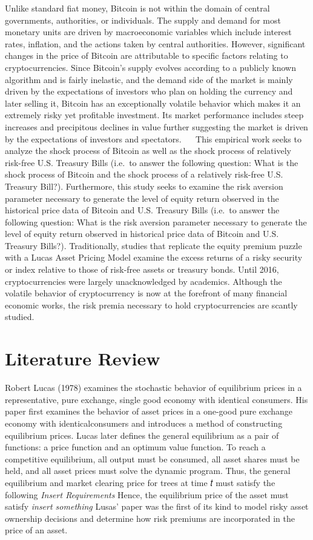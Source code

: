 \documentclass[]{article}
\begin{document}
Unlike standard fiat money, Bitcoin is not within the domain of central
governments, authorities, or individuals. The supply and demand for most
monetary units are driven by macroeconomic variables which include
interest rates, inflation, and the actions taken by central authorities.
However, significant changes in the price of Bitcoin are attributable to
specific factors relating to cryptocurrencies. Since Bitcoin's supply
evolves according to a publicly known algorithm and is fairly inelastic,
and the demand side of the market is mainly driven by the expectations
of investors who plan on holding the currency and later selling it,
Bitcoin has an exceptionally volatile behavior which makes it an
extremely risky yet profitable investment. Its market performance
includes steep increases and precipitous declines in value further
suggesting the market is driven by the expectations of investors and
spectators.   This empirical work seeks to analyze the shock process of
Bitcoin as well as the shock process of relatively risk-free U.S.
Treasury Bills (i.e.~to answer the following question: What is the shock
process of Bitcoin and the shock process of a relatively risk-free U.S.
Treasury Bill?). Furthermore, this study seeks to examine the risk
aversion parameter necessary to generate the level of equity return
observed in the historical price data of Bitcoin and U.S. Treasury Bills
(i.e.~to answer the following question: What is the risk aversion
parameter necessary to generate the level of equity return observed in
historical price data of Bitcoin and U.S. Treasury Bills?).
Traditionally, studies that replicate the equity premium puzzle with a
Lucas Asset Pricing Model examine the excess returns of a risky security
or index relative to those of risk-free assets or treasury bonds. Until
2016, cryptocurrencies were largely unacknowledged by academics.
Although the volatile behavior of cryptocurrency is now at the forefront
of many financial economic works, the risk premia necessary to hold
cryptocurrencies are scantly studied.

\section{Literature Review}\label{literature-review}

Robert Lucas (1978) examines the stochastic behavior of equilibrium
prices in a representative, pure exchange, single good economy with
identical consumers. His paper first examines the behavior of asset
prices in a one-good pure exchange economy with identicalconsumers and
introduces a method of constructing equilibrium prices. Lucas later
defines the general equilibrium as a pair of functions: a price function
and an optimum value function. To reach a competitive equilibrium, all
output must be consumed, all asset shares must be held, and all asset
prices must solve the dynamic program. Thus, the general equilibrium and
market clearing price for trees at time 𝑡 must satisfy the following
\emph{Insert Requirements} Hence, the equilibrium price of the asset
must satisfy \emph{insert something} Lusas' paper was the first of its
kind to model risky asset ownership decisions and determine how risk
premiums are incorporated in the price of an asset.
\end{document}
